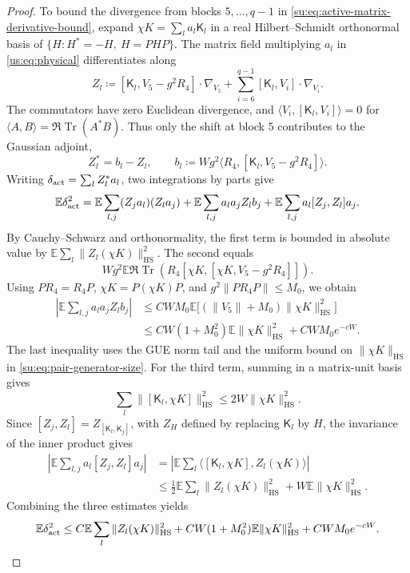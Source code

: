 \documentclass[11pt]{article}
\numberwithin{equation}{section}
\theoremstyle{remark}
\newcommand{\E}{\mathbb E}
\newcommand{\Tr}{\operatorname{Tr}}
\newcommand{\HS}{\mathrm{HS}}
\begin{document}
\begin{proof}
To bound the divergence from blocks $5,\ldots,q-1$ in
\eqref{su:eq:active-matrix-derivative-bound}, expand
$\chi K=\sum_l a_l\mathsf K_l$ in a real Hilbert--Schmidt orthonormal
basis of $\{H:H^*=-H,\ H=PHP\}$. The matrix field multiplying $a_l$
in \eqref{us:eq:physical} differentiates along
\[
 Z_l\coloneqq[\mathsf K_l,V_5-g^2R_4]\cdot\nabla_{V_5}
       +\sum_{i=6}^{q-1}[\mathsf K_l,V_i]\cdot\nabla_{V_i}.
\]
The commutators have zero Euclidean divergence, and
$\langle V_i,[\mathsf K_l,V_i]\rangle=0$ for
$\langle A,B\rangle=\Re\Tr(A^*B)$. Thus only the shift at block $5$
contributes to the Gaussian adjoint,
\[
 Z_l^*=b_l-Z_l,\qquad
 b_l\coloneqq Wg^2\langle R_4,[\mathsf K_l,V_5-g^2R_4]\rangle.
\]
Writing $\delta_{\rm act}=\sum_l Z_l^*a_l$, two integrations by parts give
\begin{equation}\label{su:eq:active-divergence-decomposition}
 \E\delta_{\rm act}^2
 =\E\sum_{l,j}(Z_ja_l)(Z_la_j)
  +\E\sum_{l,j}a_la_jZ_lb_j
  +\E\sum_{l,j}a_l[Z_j,Z_l]a_j.
\end{equation}
By Cauchy--Schwarz and orthonormality, the first term is bounded in
absolute value by $\E\sum_l\|Z_l(\chi K)\|_{\HS}^2$. The second equals
\[
 Wg^2\E\Re\Tr\!\left(R_4[\chi K,[\chi K,V_5-g^2R_4]]\right).
\]
Using $PR_4=R_4P$, $\chi K=P(\chi K)P$, and
$g^2\|PR_4P\|\le M_0$, we obtain
\[
 \begin{aligned}
 \left|\E\sum_{l,j}a_la_jZ_lb_j\right|
 &\le CWM_0\E\bigl[(\|V_5\|+M_0)\|\chi K\|_{\HS}^2\bigr]\\
 &\le CW(1+M_0^2)\E\|\chi K\|_{\HS}^2+CWM_0e^{-cW}.
 \end{aligned}
\]
The last inequality uses the GUE norm tail and the uniform bound
on $\|\chi K\|_{\HS}$ in \eqref{su:eq:pair-generator-size}.
For the third term, summing in a matrix-unit basis gives
\begin{equation}\label{su:eq:commutator-basis-bound}
 \sum_l\|[\mathsf K_l,\chi K]\|_{\HS}^2
 \le2W\|\chi K\|_{\HS}^2.
\end{equation}
Since $[Z_j,Z_l]=Z_{[\mathsf K_l,\mathsf K_j]}$, with $Z_H$ defined
by replacing $\mathsf K_l$ by $H$, the invariance of the inner product gives
\[
 \begin{aligned}
 \left|\E\sum_{l,j}a_l[Z_j,Z_l]a_j\right|
 &=\left|\E\sum_l\langle[\mathsf K_l,\chi K],Z_l(\chi K)\rangle\right|\\
 &\le\tfrac12\E\sum_l\|Z_l(\chi K)\|_{\HS}^2
       +W\E\|\chi K\|_{\HS}^2.
 \end{aligned}
\]
Combining the three estimates yields
\begin{equation}\label{su:eq:active-matrix-derivative-bound}
 \E\delta_{\rm act}^2
 \le C\E\sum_l\|Z_l(\chi K)\|_{\HS}^2
       +CW(1+M_0^2)\E\|\chi K\|_{\HS}^2+CWM_0e^{-cW}.
\end{equation}


\end{proof}
\end{document}
